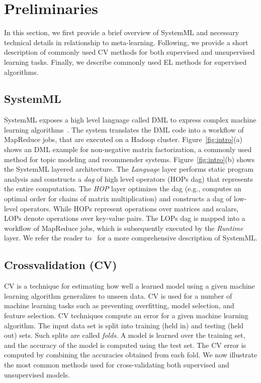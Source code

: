 \documentclass{vldb}
\begin{document}
\section{Preliminaries}
\label{sec:background}
In this section, we first provide a brief overview of SystemML and necessary technical details in
relationship to meta-learning. Following, we provide a short description of commonly used CV methods
for both supervised and unsupervised learning tasks. Finally, we describe commonly used EL methods
for supervised algorithms.

\subsection{SystemML}
SystemML exposes a high level language called DML to express complex machine learning
algorithms~\cite{systemml}. The system translates the DML code into a workflow of MapReduce jobs,
that are executed on a Hadoop cluster.  Figure~\ref{fig:intro}(a) shows an DML example for
non-negative matrix factorization, a commonly used method for topic modeling and recommender
systems. Figure~\ref{fig:intro}(b) shows the SystemML layered architecture. The {\em Language} layer
performs static program analysis and constructs a {\em dag} of high level operators (HOPs dag) that
represents the entire computation. The {\em HOP} layer optimizes the dag (e.g., computes an optimal
order for chains of matrix multiplication) and constructs a dag of low-level operators. While HOPs
represent operations over matrices and scalars, LOPs denote operations over key-value pairs. The
LOPs dag is mapped into a workflow of MapReduce jobs, which is subsequently executed by the {\em
  Runtime} layer. We refer the reader to~\cite{systemml} for a more comprehensive description of
SystemML.


\subsection{Crossvalidation (CV)}
\label{sec:cvbackground}

CV is a technique for estimating how well a learned model using a given machine learning algorithm
generalizes to unseen data. CV is used for a number of machine learning tasks such as preventing
overfitting, model selection, and feature selection. CV techniques compute an error for a given
machine learning algorithm. The input data set is split into training (held in) and testing (held
out) sets. Such splits are called {\em folds}. A model is learned over the training set, and the
accuracy of the model is computed using the test set. The CV error is computed by combining the
accuracies obtained from each fold. We now illustrate the most common methods used for
cross-validating both supervised and unsupervised models.
\end{document}
